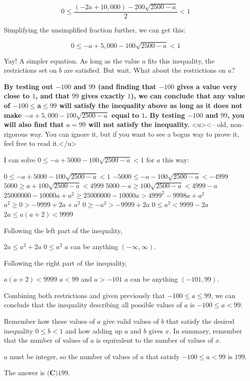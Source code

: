 \begin{enumerate}
 
 \[0 \leq \frac{(-2a+10,000) - 200\sqrt{2500-a}}{2} < 1\]

 Simplifying the unsimplified fraction further, we can get this:

 
 \[0 \leq -a + 5,000 - 100\sqrt{2500-a} < 1\]

 Yay! A simpler equation. As long as the value $a$ fits this inequality, the restrictions set on $b$ are satisfied. But wait. What about the restrictions on $a$?

 \textbf{By testing out $-100$ and $99$ (and finding that $-100$ gives a value very close to $1$, and that $99$ gives exactly $1$), we can conclude that any value of $-100 \leq$a$\leq 99$ will satisfy the inequality above as long as it does not make $-a + 5,000 - 100\sqrt{2500-a}$ equal to $1$. By testing $-100$ and $99$, you will also find that $a = 99$ will not satisfy the inequality.} <u><-- old, non-rigorous way. You can ignore it, but if you want to see a bogus way to prove it, feel free to read it.</u>

 I can solve $0 \leq -a + 5000 - 100\sqrt{2500-a} < 1$ for $a$ this way:

 $0 \leq -a + 5000 - 100\sqrt{2500-a} < 1$
$-5000 \leq -a - 100\sqrt{2500-a} < -4999$
$5000 \geq a + 100\sqrt{2500-a} < 4999$
$5000-a \geq 100\sqrt{2500-a} < 4999-a$
$25000000-10000a+a^2 \geq 25000000-10000a > 4999^2-9998a+a^2$
$a^2 \geq 0 > -9999+2a+a^2$
$0 \geq -a^2 > -9999+2a$
$0 \leq a^2 < 9999-2a$
$2a \leq a(a+2) < 9999$

 Following the left part of the inequality,

 $2a \leq a^2 + 2a$
$0 \leq a^2$
$a$ can be anything $(-\infty, \infty)$.

 Following the right part of the inequality,

 $a(a+2) < 9999$
$a < 99$ and $a > -101$
$a$ can be anything $(-101, 99)$.

 Combining both restrictions and given previously that $-100 \leq a \leq 99$, we can conclude that the inequality describing all possible values of $a$ is $-100 \leq a < 99$.

 Remember how these values of $a$ give valid values of $b$ that satisfy the desired inequality $0 \leq b < 1$ and how adding up $a$ and $b$ gives $x$. In summary, remember that the number of values of $a$ is equivalent to the number of values of $x$.

 $a$ must be integer, so the number of values of $a$ that satisfy $-100 \leq a < 99$ is $\boxed{199}$.

 The answer is $\boxed{\textbf{(C)} 199}$.


\end{enumerate}
